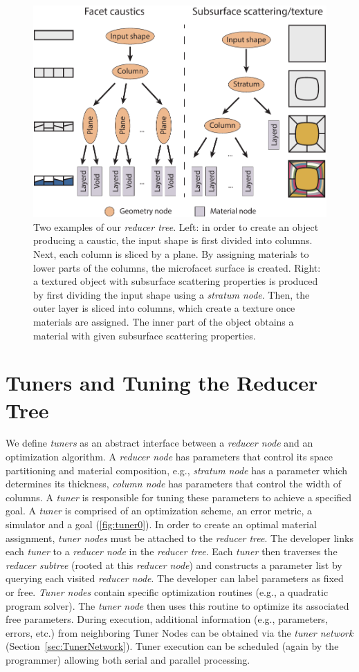 \begin{figure}[h]
\centering
\includegraphics[width=0.7\linewidth]{figure/redNetworkNew.pdf}
\caption{Two examples of our \emph{reducer tree}. Left: in order to create an object producing a caustic, the input shape is first divided into columns. Next, each column is sliced by a plane.
By assigning materials to lower parts of the columns, the microfacet surface is created.
Right: a textured object with subsurface scattering properties is produced by first dividing the input shape using a \emph{stratum node}. Then, the outer layer is sliced into columns, which create a texture once materials are assigned. The inner part of the object obtains a material with given subsurface scattering properties.  
}
\label{fig:red1}
\end{figure}

\section{Tuners and Tuning the Reducer Tree}
We define \emph{tuners} as an abstract interface between a \emph{reducer node} and an optimization algorithm. 
A \emph{reducer node} has parameters that control its space partitioning and material composition, e.g., \emph{stratum node} has a parameter which determines its thickness, \emph{column node} has parameters that control the width of columns.
A \emph{tuner} is responsible for tuning these parameters to achieve a specified goal.
A \emph{tuner} is comprised of an optimization scheme, an error metric, a simulator and a goal (\autoref{fig:tuner0}). 
In order to create an optimal material assignment, \emph{tuner nodes} must be attached to the \emph{reducer tree}. The developer links each \emph{tuner} to a \emph{reducer node} in the \emph{reducer tree}. Each \emph{tuner} then traverses the \emph{reducer subtree} (rooted at this \emph{reducer node}) and constructs a parameter list by querying each visited \emph{reducer node}. The developer can label parameters as fixed or free. \emph{Tuner nodes} contain specific optimization routines (e.g., a quadratic program solver). The \emph{tuner node} then uses this routine to optimize its associated free parameters. During execution, additional information (e.g., parameters, errors, etc.) from neighboring Tuner Nodes can be obtained via the \emph{tuner network} (Section~\ref{sec:TunerNetwork}).  Tuner execution can be scheduled (again by the programmer) allowing both serial and parallel processing. 

